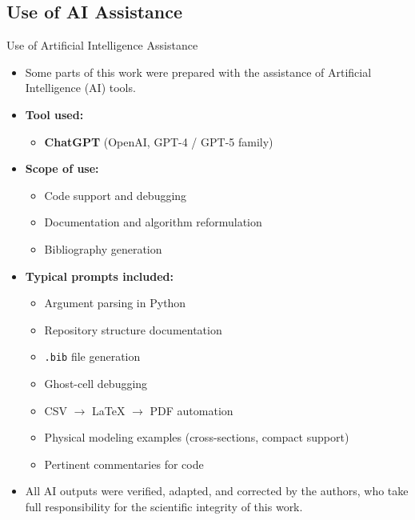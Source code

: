 \documentclass[11pt]{beamer}
\begin{document}
\subsection{Use of AI Assistance}
\begin{frame}{Use of Artificial Intelligence Assistance}

\small
\begin{itemize}
    \item Some parts of this work were prepared with the assistance of Artificial Intelligence (AI) tools.
    
    \item \textbf{Tool used:}
    \begin{itemize}
        \item \textbf{ChatGPT} (OpenAI, GPT-4 / GPT-5 family)
    \end{itemize}

    \item \textbf{Scope of use:}
    \begin{itemize}
        \item Code support and debugging
        \item Documentation and algorithm reformulation
        \item Bibliography generation
    \end{itemize}

    \item \textbf{Typical prompts included:}
    \begin{itemize}
        \item Argument parsing in Python
        \item Repository structure documentation
        \item \texttt{.bib} file generation
        \item Ghost-cell debugging
        \item CSV $\rightarrow$ \LaTeX{} $\rightarrow$ PDF automation
        \item Physical modeling examples (cross-sections, compact support)
        \item Pertinent commentaries for code
    \end{itemize}

    \item All AI outputs were verified, adapted, and corrected by the authors, who take full responsibility for the scientific integrity of this work.
\end{itemize}

\end{frame}
\end{document}

